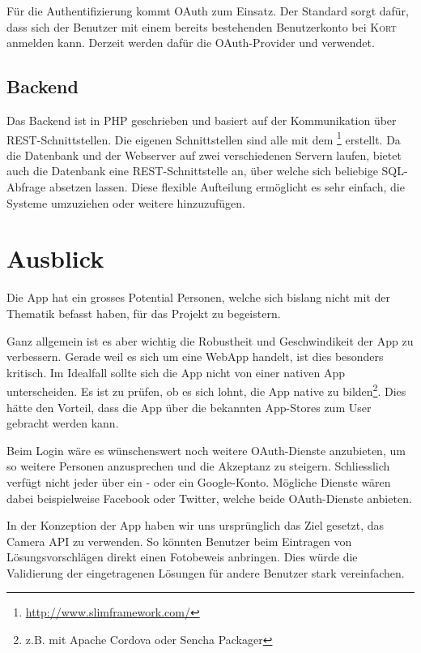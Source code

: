Für die Authentifizierung kommt \gls{OAuth} zum Einsatz.
Der Standard sorgt dafür, dass sich der Benutzer mit einem bereits bestehenden Benutzerkonto bei \textsc{Kort} anmelden kann.
Derzeit werden dafür die \gls{OAuth}-Provider  und  verwendet.

\subsection*{Backend}
Das Backend ist in PHP geschrieben und basiert auf der Kommunikation über \gls{REST}-Schnittstellen.
Die eigenen Schnittstellen sind alle mit dem \footnote{\url{http://www.slimframework.com/}} erstellt.
Da die Datenbank und der Webserver auf zwei verschiedenen Servern laufen, bietet auch die Datenbank eine \gls{REST}-Schnittstelle an, über welche sich beliebige SQL-Abfrage absetzen lassen.
Diese flexible Aufteilung ermöglicht es sehr einfach, die Systeme umzuziehen oder weitere hinzuzufügen.

\section*{Ausblick}
Die App hat ein grosses Potential Personen, welche sich bislang nicht mit der Thematik  befasst haben, für das Projekt zu begeistern.

Ganz allgemein ist es aber wichtig die Robustheit und Geschwindikeit der App zu verbessern. 
Gerade weil es sich um eine \gls{WebApp} handelt, ist dies besonders kritisch. 
Im Idealfall sollte sich die App nicht von einer nativen App unterscheiden.
Es ist zu prüfen, ob es sich lohnt, die App native zu bilden\footnote{z.B. mit Apache Cordova oder Sencha Packager}.
Dies hätte den Vorteil, dass die App über die bekannten \glspl{App-Store} zum User gebracht werden kann.

Beim Login wäre es wünschenswert noch weitere \gls{OAuth}-Dienste anzubieten, um so weitere Personen anzusprechen und die Akzeptanz zu steigern.
Schliesslich verfügt nicht jeder über ein - oder ein Google-Konto.
Mögliche Dienste wären dabei beispielweise Facebook oder Twitter, welche beide \gls{OAuth}-Dienste anbieten.

In der Konzeption der App haben wir uns ursprünglich das Ziel gesetzt, das \gls{Camera API} zu verwenden. 
So könnten Benutzer beim Eintragen von Lösungsvorschlägen direkt einen Fotobeweis anbringen. 
Dies würde die Validierung der eingetragenen Lösungen für andere Benutzer stark vereinfachen.

